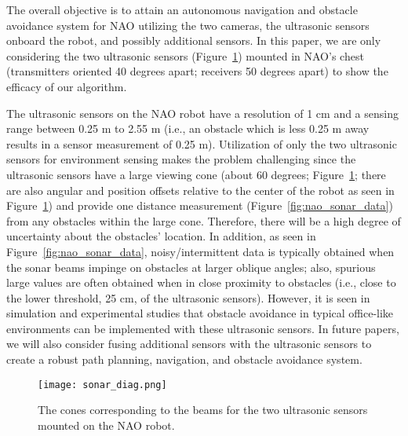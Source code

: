 \documentclass[10pt,conference]{ieeeconf}
\begin{document}
The overall objective is to attain an autonomous navigation and
obstacle avoidance system for NAO utilizing the two cameras, the ultrasonic sensors onboard the robot, and possibly additional sensors. In this paper,
we are only considering the two ultrasonic sensors (Figure~\ref{fig:nao_sonar}) mounted in NAO's chest
(transmitters oriented 40 degrees apart; receivers 50 degrees apart) to show
the efficacy of our algorithm. 

The ultrasonic sensors on the NAO
robot have a resolution of 1 cm and a sensing range between 0.25 m to 2.55 m
(i.e., an obstacle which is less 0.25 m away results in a sensor measurement
of 0.25 m). 
Utilization of only the two ultrasonic sensors for environment sensing
makes the problem challenging since the ultrasonic sensors have a large
viewing cone (about 60 degrees; Figure~\ref{fig:nao_sonar}; there are also
angular and position offsets relative to the center of the robot as seen in Figure~\ref{fig:nao_sonar}) and provide one distance measurement (Figure~\ref{fig:nao_sonar_data}) from 
any obstacles within the large cone. Therefore, there will be a high degree of
uncertainty about the obstacles' location. In addition, as seen in Figure~\ref{fig:nao_sonar_data}, noisy/intermittent data is typically obtained when the sonar beams impinge on obstacles at larger oblique angles; also, spurious large values are often obtained when in close proximity to obstacles (i.e., close to the lower threshold, 25 cm, of the ultrasonic sensors). 
However, it is seen in simulation and experimental studies 
that obstacle avoidance in typical office-like environments can be implemented with these ultrasonic sensors.
In future papers, we will also consider fusing additional sensors with the ultrasonic sensors to create a robust path planning, navigation, and obstacle avoidance system.


\begin{figure}[htb]
    \vspace*{-0.15in}
  \centerline{\texttt{[image: sonar\_diag.png]}} 
        \caption{The cones corresponding to the beams for the two ultrasonic
        sensors mounted on the NAO robot.}
    \label{fig:nao_sonar}
    \vspace*{-0.2in}
\end{figure}
\end{document}
